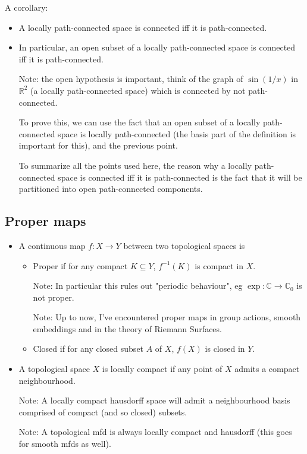 \documentclass{report}
\theoremstyle{definition}
\begin{document}
A corollary:
\begin{itemize}
    \item A locally path-connected space is connected iff it is path-connected.
    \item In particular, an open subset of a locally path-connected space is connected iff it is path-connected.

    Note: the open hypothesis is important, think of the graph of $\sin(1/x)$ in $\mathbb{R}^2$ (a locally path-connected space) which is connected by not path-connected.

    To prove this, we can use the fact that an open subset of a locally path-connected space is locally path-connected (the basis part of the definition is important for this), and the previous point.

    To summarize all the points used here, the reason why a locally path-connected space is connected iff it is path-connected is the fact that it will be partitioned into open path-connected components.
\end{itemize}

\subsection{Proper maps}

\begin{itemize}
    \item A continuous map $f:X\to Y$ between two topological spaces is
    \begin{itemize}
        \item Proper if for any compact $K\subseteq Y$, $f^{-1}(K)$ is compact in $X$.

        Note: In particular this rules out "periodic behaviour", eg $\exp:\mathbb{C}\to\mathbb{C}_0$ is not proper.

        Note: Up to now, I've encountered proper maps in group actions, smooth embeddings and in the theory of Riemann Surfaces.
        \item Closed if for any closed subset $A$ of $X$, $f(X)$ is closed in $Y$.
    \end{itemize}
    \item A topological space $X$ is locally compact if any point of $X$ admits a compact neighbourhood.

    Note: A locally compact hausdorff space will admit a neighbourhood basis comprised of compact (and so closed) subsets.
    
    Note: A topological mfd is always locally compact and hausdorff (this goes for smooth mfds as well).
\end{itemize}
\end{document}
